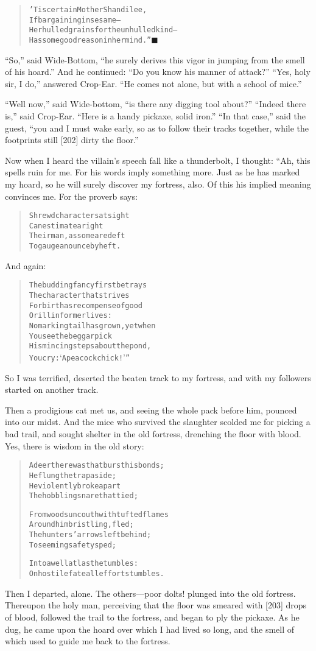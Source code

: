 \documentclass[article, twoside, 14pt]{memoir}
\newcommand{\qed}{\hfill \ensuremath{\blacksquare}}
\renewenvironment{verbatim}{%
\begin{quote}%
\vskip -10pt%
\begin{alltt}\normalfont\large}{\end{alltt}%
\end{quote}%
\vskip -10pt
} %
\begin{document}
\begin{verbatim}
'Tis certain Mother Shandilee,
If bargaining in sesame--
Her hulled grains for the unhulled kind--
Has some good reason in her mind.”\hyperref[s39]{\qed}
\end{verbatim}
``So,'' said Wide-Bottom,
``he surely derives this vigor in jumping from the smell of his hoard.''
And he continued: ``Do you know his manner of attack?''
``Yes, holy sir, I do,'' answered Crop-Ear.
``He comes not alone, but with a school of mice.''

``Well now,'' said Wide-bottom,
``is there any digging tool about?'' ``Indeed there is,'' said
Crop-Ear. ``Here is a handy pickaxe, solid iron.''
``In that case,'' said the guest,
``you and I must wake early, so as to follow their tracks together, while the footprints still [202] dirty the floor.''

Now when I heard the villain's speech fall like a thunderbolt, I
thought: “Ah, this spells ruin for me. For his words imply
something more. Just as he has marked my hoard, so he will surely
discover my fortress, also. Of this his implied meaning convinces
me. For the proverb says:

\begin{verbatim}
Shrewd characters at sight
Can estimate aright
Their man, as some are deft
To gauge an ounce by heft.
\end{verbatim}
And again:

\begin{verbatim}
The budding fancy first betrays
    The character that strives
For birth as recompense of good
    Or ill in former lives:
No marking tail has grown, yet when
    You see the beggar pick
His mincing steps about the pond,
    You cry: ‘A peacock chick!’”
\end{verbatim}
So I was terrified, deserted the beaten track to my fortress, and
with my followers started on another track.

Then a prodigious cat met us, and seeing the whole pack before him,
pounced into our midst. And the mice who survived the slaughter
scolded me for picking a bad trail, and sought shelter in the old
fortress, drenching the floor with blood. Yes, there is wisdom in
the old story:

\begin{verbatim}
A deer there was that burst his bonds;
    He flung the trap aside;
He violently broke apart
    The hobbling snare that tied;

From woods uncouth with tufted flames
    Around him bristling, fled;
The hunters' arrows left behind;
    To seeming safety sped;

Into a well at last he tumbles:
On hostile fate all effort stumbles.
\end{verbatim}
Then I departed, alone. The others---poor dolts! plunged into the
old fortress. Thereupon the holy man, perceiving that the floor was
smeared with [203] drops of blood, followed the trail to the
fortress, and began to ply the pickaxe. As he dug, he came upon the
hoard over which I had lived so long, and the smell of which used
to guide me back to the fortress.
\end{document}
